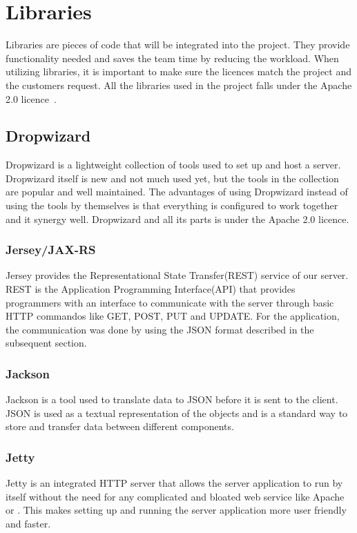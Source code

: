 \section{Libraries}
Libraries are pieces of code that will be integrated into the project. They provide functionality needed and saves the team time by reducing the workload. When utilizing libraries, it is important to make sure the licences match the project and the customers request. All the libraries used in the project falls under the Apache 2.0 licence~\cite{Apache}.

\subsection{Dropwizard}
Dropwizard is a lightweight collection of tools used to set up and host a server. Dropwizard itself is new and not much used yet, but the tools in the collection are popular and well maintained. The advantages of using Dropwizard instead of using the tools by themselves is that everything is configured to work together and it \gls{synergy} well.
Dropwizard and all its parts is under the Apache 2.0 licence. 

\subsubsection{Jersey/JAX-RS}
Jersey provides the Representational State Transfer(REST) service of our server. REST is the Application Programming Interface(API) that provides programmers with an interface to communicate with the server through basic HTTP commandos like GET, POST, PUT and UPDATE. For the application, the communication was done by using the JSON format described in the subsequent section.

\subsubsection{Jackson}
Jackson is a tool used to translate data to JSON before it is sent to the client. JSON is used as a textual representation of the objects and is a standard way to store and transfer data between different components.

\subsubsection{Jetty}
Jetty is an integrated HTTP server that allows the server application to run by itself without the need for any  complicated and \gls{bloated} web service like Apache or . This makes setting up and running the server application more user friendly and faster.

